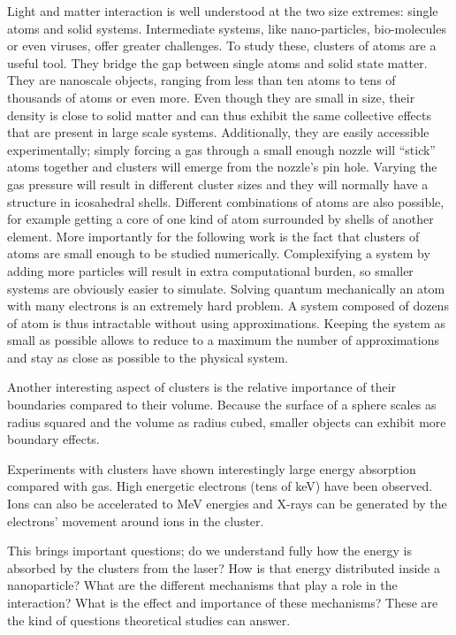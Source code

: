 Light and matter interaction is well understood at the two size extremes:
single atoms and solid systems. Intermediate systems, like nano-particles,
bio-molecules or even viruses\cite{Seibert2011}, offer greater challenges. To
study these, clusters of atoms are
a useful tool. They bridge the gap between single atoms and solid state
matter. They are nanoscale objects, ranging from less than ten atoms to tens of
thousands of atoms or even more. Even though they are small in size, their
density is close to solid matter and can thus exhibit the same collective
effects that are present in large scale systems. Additionally, they are easily
accessible experimentally; simply forcing a gas through a small enough nozzle
will ``stick'' atoms together and clusters will emerge from the nozzle's pin
hole. Varying the gas pressure will result in different cluster sizes
and they will normally have a structure in icosahedral shells.
Different combinations of atoms are also possible, for example getting a core of
one kind of atom surrounded by shells of another element. More importantly for
the following work is the fact that clusters of atoms are small enough to be
studied numerically. Complexifying a system by adding more particles will
result in extra computational burden, so smaller systems are obviously easier
to simulate. Solving quantum mechanically an atom with many electrons is an
extremely hard problem. A system composed of dozens of atom is thus intractable
without using approximations. Keeping the system as small as possible allows to
reduce to a maximum the number of approximations and stay as close as possible
to the physical system.

Another interesting aspect of clusters is the relative importance of
their boundaries compared to their volume. Because the surface of a sphere
scales as radius squared and the volume as radius cubed, smaller objects can
exhibit more boundary effects.

Experiments with clusters have shown interestingly large energy absorption
compared with gas. High energetic electrons (tens of keV) have been observed.
Ions can also be accelerated to MeV energies and X-rays can be generated by the
electrons' movement around ions in the cluster\cite{Ramunno2008}.

This brings important questions; do we understand fully how the energy is
absorbed by the clusters from the laser? How is that energy distributed
inside a nanoparticle? What are the different mechanisms that play a role in
the interaction? What is the effect and importance of these mechanisms? These
are the kind of questions theoretical studies can answer.


